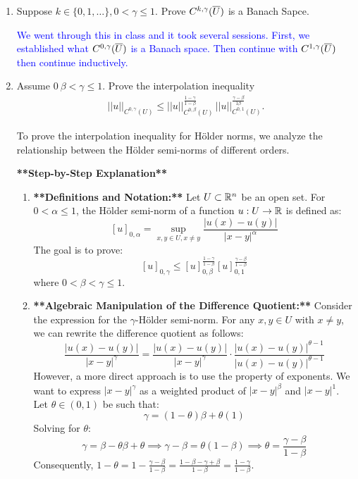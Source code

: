 \documentclass[12pt,a4paper]{report}
\newcommand{\BLUE}[1]{\textcolor{blue}{#1}}
\newcommand{\HSPACE}[3]{C^{#1,#2}(#3)}
\newcommand{\HOLDERNORM}[4]{|| #4 ||_{\HSPACE{#1}{#2}{#3}}}
\begin{document}
\begin{enumerate}
	\item Suppose $k \in \{0,1,\dots\}, 0 < \gamma \le 1$.  Prove $\HSPACE{k}{\gamma}{\CONJ{U}}$ is a Banach Sapce.
	
	\BLUE{We went through this in class and it took several sessions.  First, we established what $\HSPACE{0}{\gamma}{\CONJ{U}}$ is a Banach space.  Then continue with $\HSPACE{1}{\gamma}{\CONJ{U}}$ then continue inductively.
	}
	
	\item Assume $0 \ \beta < \gamma \le 1$.  Prove the interpolation inequality
	\begin{align*}
		\HOLDERNORM{0}{\gamma}{U}{u}\le \HOLDERNORM{0}{\beta}{U}{u}^{\frac{1-\gamma}{1-\beta}}\,\HOLDERNORM{0}{1}{U}{u}^{\frac{\gamma-\beta}{1\beta}}.
	\end{align*}
	
	To prove the interpolation inequality for Hölder norms, we analyze the relationship between the Hölder semi-norms of different orders.

\textbf{**Step-by-Step Explanation**}

\begin{enumerate}
\item \textbf{**Definitions and Notation:**}
    Let $U \subset \mathbb{R}^n$ be an open set. For $0 < \alpha \le 1$, the Hölder semi-norm of a function $u: U \to \mathbb{R}$ is defined as:
    $$[u]_{0,\alpha} = \sup_{x, y \in U, x \neq y} \frac{|u(x) - u(y)|}{|x - y|^\alpha}$$
    The goal is to prove:
    $$[u]_{0,\gamma} \le [u]_{0,\beta}^{\frac{1-\gamma}{1-\beta}} [u]_{0,1}^{\frac{\gamma-\beta}{1-\beta}}$$
    where $0 < \beta < \gamma \le 1$.

\item \textbf{**Algebraic Manipulation of the Difference Quotient:**}
    Consider the expression for the $\gamma$-Hölder semi-norm. For any $x, y \in U$ with $x \neq y$, we can rewrite the difference quotient as follows:
    $$\frac{|u(x) - u(y)|}{|x - y|^\gamma} = \frac{|u(x) - u(y)|}{|x - y|^{\gamma}} \cdot \frac{|u(x) - u(y)|^{\theta - 1}}{|u(x) - u(y)|^{\theta - 1}}$$
    However, a more direct approach is to use the property of exponents. We want to express $|x-y|^\gamma$ as a weighted product of $|x-y|^\beta$ and $|x-y|^1$.
    Let $\theta \in (0, 1)$ be such that:
    $$\gamma = (1 - \theta)\beta + \theta(1)$$
    Solving for $\theta$:
    $$\gamma = \beta - \theta\beta + \theta \implies \gamma - \beta = \theta(1 - \beta) \implies \theta = \frac{\gamma - \beta}{1 - \beta}$$
    Consequently, $1 - \theta = 1 - \frac{\gamma - \beta}{1 - \beta} = \frac{1 - \beta - \gamma + \beta}{1 - \beta} = \frac{1 - \gamma}{1 - \beta}$.


\end{enumerate}
\end{enumerate}
\end{document}
